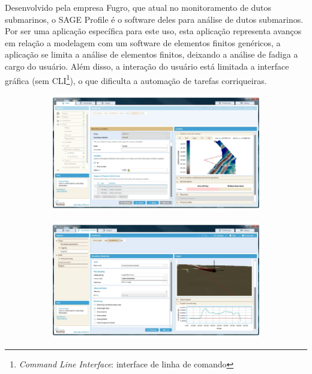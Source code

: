 Desenvolvido pela empresa Fugro, que atual no monitoramento de dutos submarinos, o SAGE Profile
é o software deles para análise de dutos submarinos. Por ser uma aplicação específica para este uso, esta aplicação representa avanços em relação a modelagem com um software de elementos finitos genéricos, a aplicação se limita a análise de elementos finitos, deixando a análise de fadiga a cargo do usuário. Além disso, a interação do usuário está limitada a interface gráfica (sem CLI\footnote{\textit{Command Line Interface}: interface de linha de comando}), o que dificulta a automação de tarefas corriqueiras.

\begin{figure}[!ht]
    \centering
    \caption{Interface gráfica do SAGE Profile.}\label{fig:sage_profile}
    \begin{subfigure}[t]{0.49\textwidth}
        \centering
        \includegraphics[width=\textwidth]{imagens/sage_profile_1}
    \end{subfigure}
    \hfill
    \begin{subfigure}[t]{0.49\textwidth}
        \centering
        \includegraphics[width=\textwidth]{imagens/sage_profile_2}
    \end{subfigure}
\end{figure}



